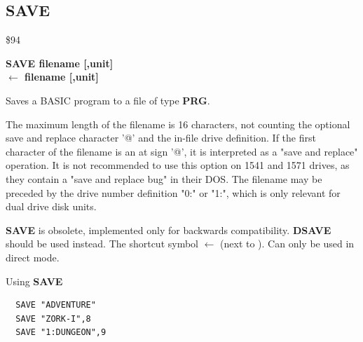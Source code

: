 \subsection{SAVE}
\begin{description}[leftmargin=2cm,style=nextline]
\item [Token:] \$94
\item [Format:] {\bf SAVE filename [,unit] } \\
                {\bf $\leftarrow$ filename [,unit] }
\item [Usage:]
   Saves a BASIC program to a file of type {\bf PRG}.

   \filenamedefinition

   The maximum length of the filename is 16 characters,
   not counting the optional save and replace character '@'
   and the in-file drive definition.
   If the first character of the filename is an at sign '@', it
   is interpreted as a "save and replace" operation. It is not recommended
   to use this option on 1541 and 1571 drives, as they
   contain a "save and replace bug" in their DOS.
   The filename may be preceded by the drive number definition
   "0:" or "1:", which is only relevant for dual drive disk units.

   \unitdefinition

\item [Remarks:] {\bf SAVE} is obsolete, implemented only for backwards compatibility.
                 {\bf DSAVE} should be used instead.
                 The shortcut symbol {\bf $\leftarrow$} (next to ). Can only be used in direct mode.

\item [Examples:] Using {\bf SAVE}
\begin{tcolorbox}[colback=black,coltext=white]
\verbatimfont{\codefont}
\begin{verbatim}
  SAVE "ADVENTURE"
  SAVE "ZORK-I",8
  SAVE "1:DUNGEON",9
\end{verbatim}
\end{tcolorbox}
\end{description}


\newpage

